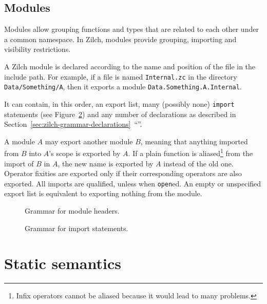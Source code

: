 \section{Modules}\label{sec:zilch-grammar-modules}

Modules allow grouping functions and types that are related to each other under a common namespace.
In Zilch, modules provide grouping, importing and visibility restrictions.

A Zilch module is declared according to the name and position of the file in the include path.
For example, if a file is named \verb|Internal.zc| in the directory \verb|Data/Something/A|, then it exports a module \verb|Data.Something.A.Internal|.

It can contain, in this order, an export list, many (possibly none) \texttt{import} statements (see Figure~\ref{fig:zilch-grammar-modules-importgrammar}) and any number of declarations as described in Section~\ref{sec:zilch-grammar-declarations}~``''.

A module $A$ may export another module $B$, meaning that anything imported from $B$ into $A$'s scope is exported by $A$.
If a plain function is aliased\footnote{Infix operators cannot be aliased because it would lead to many problems.} from the import of $B$ in $A$, the new name is exported by $A$ instead of the old one.
Operator fixities are exported only if their corresponding operators are also exported.
All imports are qualified, unless when \verb|open|ed.
An empty or unspecified export list is equivalent to exporting nothing from the module.

\begin{figure}[H]
	\centering


	\caption{Grammar for module headers.}
	\label{fig:zilch-grammar-modules-headergrammar}
\end{figure}

\begin{figure}[H]
	\centering


	\caption{Grammar for import statements.}
	\label{fig:zilch-grammar-modules-importgrammar}
\end{figure}

\chapter{Static semantics}\label{chap:zilch-staticsem}

